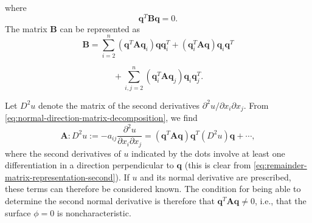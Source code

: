 where
\begin{equation}\label{eq:remainder-normal-component-zero}
\bm{q}^T\bm{B}\bm{q}=0.
\end{equation}
The matrix $\bm{B}$ can be represented as
\begin{equation}\label{eq:remainder-matrix-representation-first}
\bm{B}=\sum_{i=2}^n(\bm{q}^T\bm{A}\bm{q}_i)\bm{q}\bm{q}_i^T+(\bm{q}_i^T\bm{A}\bm{q})\bm{q}_i\bm{q}^T
\end{equation}

\begin{equation}\label{eq:remainder-matrix-representation-second}
{}+\sum_{i,j=2}^n(\bm{q}_i^T\bm{A}\bm{q}_j)\bm{q}_i\bm{q}_j^T.
\end{equation}


Let $D^2u$ denote the matrix of the second derivatives $\partial^2u/\partial x_i\partial x_j$. From \eqref{eq:normal-direction-matrix-decomposition}, we find
\begin{equation}\label{eq:normal-second-derivative-determination}
\bm{A}:D^2u:=-a_{ij}\dfrac{\partial^2u}{\partial x_i\partial x_j}=(\bm{q}^T\bm{A}\bm{q})\bm{q}^T(D^2u)\bm{q}+\cdots,
\end{equation}
where the second derivatives of $u$ indicated by the dots involve at least one differentiation in a direction perpendicular to $\bm{q}$ (this is clear from \eqref{eq:remainder-matrix-representation-second}). If $u$ and its normal derivative are prescribed, these terms can therefore be considered known. The condition for being able to determine the second normal derivative is therefore that $\bm{q}^T\bm{A}\bm{q}\ne0$, i.e., that the surface $\phi=0$ is noncharacteristic.
